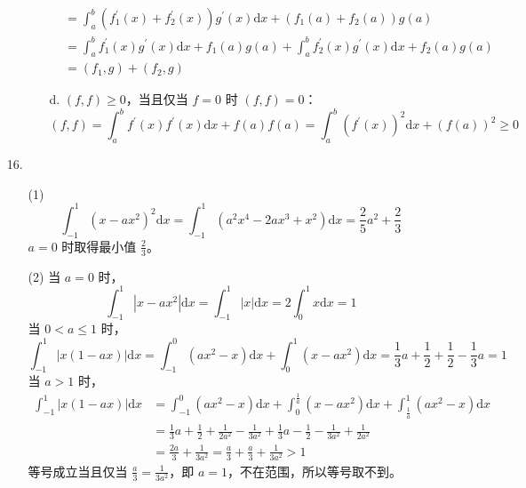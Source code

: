 \documentclass{sjtuarticle}
\def\dd{\mathrm{d}}
\begin{document}
\begin{itemize}
\begin{solution}
\begin{itemize}
\begin{itemize}
\begin{equation*}
\begin{aligned}
                        &=\int_a^b (f_1^\prime(x)+f_2^\prime(x))g^\prime(x)\dd x+(f_1(a)+f_2(a))g(a)\\
                        &=\int_a^b f_1^\prime(x)g^\prime(x)\dd x+f_1(a)g(a)+\int_a^b f_2^\prime(x)g^\prime(x)\dd x+f_2(a)g(a)\\
                        &=(f_1,g)+(f_2,g)
                    \end{aligned}
                \end{equation*}
                \item[d.] $(f,f)\geq 0$，当且仅当 $f=0$ 时 $(f,f)=0$：
                \begin{equation*}
                    (f,f)=\int_a^b f^\prime(x)f^\prime(x)\dd x+f(a)f(a)=\int_a^b (f^\prime(x))^2\dd x+(f(a))^2\geq 0
                \end{equation*}
            \end{itemize}
        \end{itemize}
    \end{solution}
    \item[16.] \begin{solution}
        \begin{itemize}
            \item[(1)]\begin{equation*}
                \int_{-1}^1 (x-ax^2)^2\dd x = \int_{-1}^1 (a^2x^4-2ax^3+x^2) \dd x=\frac{2}{5}a^2+\frac{2}{3}
            \end{equation*}
            $a=0$ 时取得最小值 $\frac{2}{3}$。
            \item[(2)] 当 $a=0$ 时，
            \begin{equation*}
                \int_{-1}^1 |x-ax^2|\dd x = \int_{-1}^1 |x|\dd x = 2\int_0^1 x\dd x=1
            \end{equation*}
            当 $0<a\leq 1$ 时，
            \begin{equation*}
                \int_{-1}^1 |x(1-ax)|\dd x = \int_{-1}^0 (ax^2-x)\dd x + \int_{0}^1 (x-ax^2)\dd x=\frac{1}{3}a+\frac{1}{2}+\frac{1}{2}-\frac{1}{3}a=1 %
            \end{equation*}
            当 $a>1$ 时，
            \begin{align*}
                \int_{-1}^1 |x(1-ax)|\dd x &= \int_{-1}^0 (ax^2-x)\dd x + \int_{0}^\frac{1}{a} (x-ax^2)\dd x + \int_{\frac{1}{a}}^1 (ax^2-x)\dd x\\
                &=\frac{1}{3}a+\frac{1}{2}+\frac{1}{2a^2}-\frac{1}{3a^2}+\frac{1}{3}a-\frac{1}{2}-\frac{1}{3a^2}+\frac{1}{2a^2}\\
                &=\frac{2a}{3}+\frac{1}{3a^2}=\frac{a}{3}+\frac{a}{3}+\frac{1}{3a^2}> 1
            \end{align*}
            等号成立当且仅当 $\frac{a}{3}=\frac{1}{3a^2}$，即 $a=1$，不在范围，所以等号取不到。


\end{itemize}
\end{solution}
\end{itemize}
\end{document}
